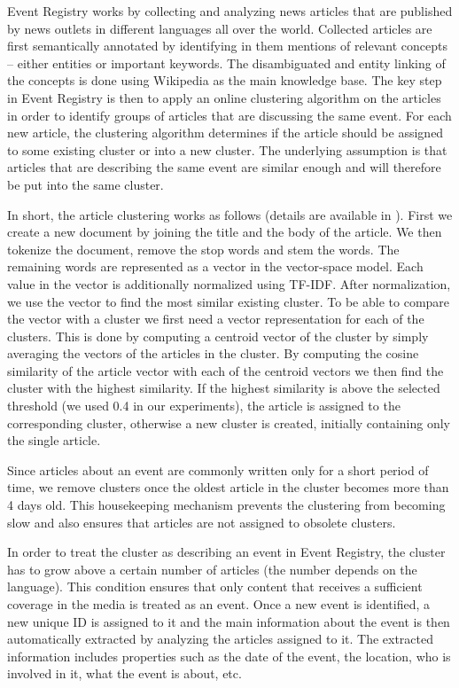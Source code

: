 \documentclass[twoside,11pt]{article}
\begin{document}
Event Registry works by collecting and analyzing news articles that are published by news outlets in different languages all over the world. Collected articles are first semantically annotated by identifying in them mentions of relevant concepts -- either entities or important keywords. The disambiguated and entity linking of the concepts is done using Wikipedia as the main knowledge base. The key step in Event Registry is then to apply an online clustering algorithm on the articles in order to identify groups of articles that are discussing the same event. For each new article, the clustering algorithm determines if the article should be assigned to some existing cluster or into a new cluster. The underlying assumption is that articles that are describing the same event are similar enough and will therefore be put into the same cluster.

In short, the article clustering works as follows (details are available in \cite{}). First we create a new document by joining the title and the body of the article. We then tokenize the document, remove the stop words and stem the words. The remaining words are represented as a vector in the vector-space model. Each value in the vector is additionally normalized using TF-IDF. After normalization, we use the vector to find the most similar existing cluster. To be able to compare the vector with a cluster we first need a vector representation for each of the clusters. This is done by computing a centroid vector of the cluster by simply averaging the vectors of the articles in the cluster. By computing the cosine similarity of the article vector with each of the centroid vectors we then find the cluster with the highest similarity. If the highest similarity is above the selected threshold (we used 0.4 in our experiments), the article is assigned to the corresponding cluster, otherwise a new cluster is created, initially containing only the single article.

Since articles about an event are commonly written only for a short period of time, we remove clusters once the oldest article in the cluster becomes more than 4 days old. This housekeeping mechanism prevents the clustering from becoming slow and also ensures that articles are not assigned to obsolete clusters.

In order to treat the cluster as describing an event in Event Registry, the cluster has to grow above a certain number of articles (the number depends on the language). This condition ensures that only content that receives a sufficient coverage in the media is treated as an event. Once a new event is identified, a new unique ID is assigned to it and the main information about the event is then automatically extracted by analyzing the articles assigned to it. The extracted information includes properties such as the date of the event, the location, who is involved in it, what the event is about, etc.
\end{document}
